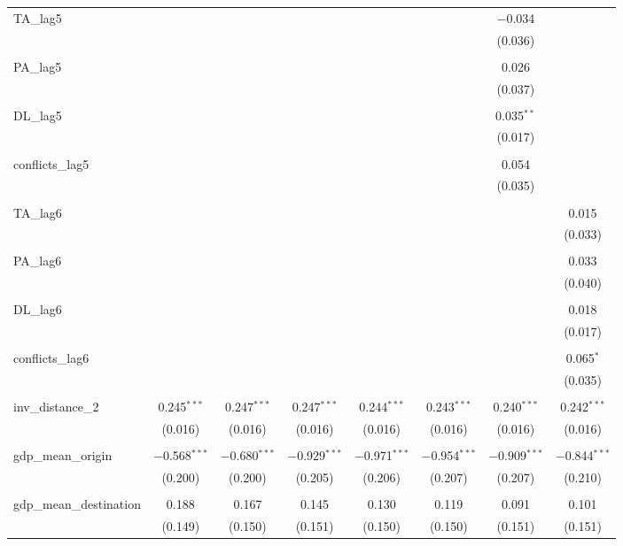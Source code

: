 \begin{table}[!htbp]
\begin{tabular}{@{\extracolsep{5pt}}lccccccc}
 TA\_lag5 &  &  &  &  &  & $-$0.034 &  \\ 
  &  &  &  &  &  & (0.036) &  \\ 
  & & & & & & & \\ 
 PA\_lag5 &  &  &  &  &  & 0.026 &  \\ 
  &  &  &  &  &  & (0.037) &  \\ 
  & & & & & & & \\ 
 DL\_lag5 &  &  &  &  &  & 0.035$^{**}$ &  \\ 
  &  &  &  &  &  & (0.017) &  \\ 
  & & & & & & & \\ 
 conflicts\_lag5 &  &  &  &  &  & 0.054 &  \\ 
  &  &  &  &  &  & (0.035) &  \\ 
  & & & & & & & \\ 
 TA\_lag6 &  &  &  &  &  &  & 0.015 \\ 
  &  &  &  &  &  &  & (0.033) \\ 
  & & & & & & & \\ 
 PA\_lag6 &  &  &  &  &  &  & 0.033 \\ 
  &  &  &  &  &  &  & (0.040) \\ 
  & & & & & & & \\ 
 DL\_lag6 &  &  &  &  &  &  & 0.018 \\ 
  &  &  &  &  &  &  & (0.017) \\ 
  & & & & & & & \\ 
 conflicts\_lag6 &  &  &  &  &  &  & 0.065$^{*}$ \\ 
  &  &  &  &  &  &  & (0.035) \\ 
  & & & & & & & \\ 
 inv\_distance\_2 & 0.245$^{***}$ & 0.247$^{***}$ & 0.247$^{***}$ & 0.244$^{***}$ & 0.243$^{***}$ & 0.240$^{***}$ & 0.242$^{***}$ \\ 
  & (0.016) & (0.016) & (0.016) & (0.016) & (0.016) & (0.016) & (0.016) \\ 
  & & & & & & & \\ 
 gdp\_mean\_origin & $-$0.568$^{***}$ & $-$0.680$^{***}$ & $-$0.929$^{***}$ & $-$0.971$^{***}$ & $-$0.954$^{***}$ & $-$0.909$^{***}$ & $-$0.844$^{***}$ \\ 
  & (0.200) & (0.200) & (0.205) & (0.206) & (0.207) & (0.207) & (0.210) \\ 
  & & & & & & & \\ 
 gdp\_mean\_destination & 0.188 & 0.167 & 0.145 & 0.130 & 0.119 & 0.091 & 0.101 \\ 
  & (0.149) & (0.150) & (0.151) & (0.150) & (0.150) & (0.151) & (0.151) \\ 

\end{tabular}
\end{table}
